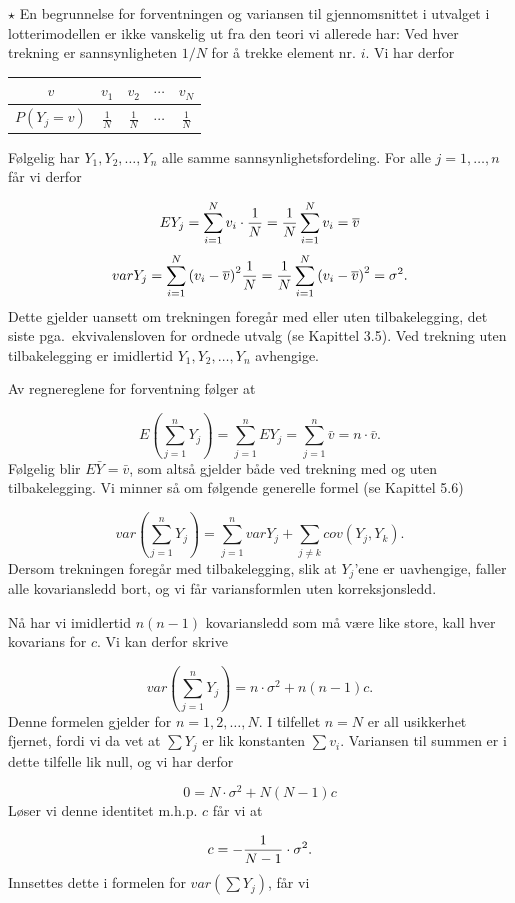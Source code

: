 $\star$ \small
En begrunnelse for forventningen og variansen til gjennomsnittet i utvalget i
lotterimodellen er ikke vanskelig ut fra den teori vi allerede har:
Ved hver trekning er sannsynligheten $1/N$ for å trekke element nr. $i$.
Vi har derfor
\begin{center}
\begin{tabular}{c|cccc}
      $v$ & $v_1$ & $v_2$ & $\cdots$ & $v_N$  \\ \hline
 $P(Y_j=v)$& $\frac{1}{N}$& $\frac{1}{N}$& $\cdots$& $\frac{1}{N}$
\end{tabular}
\end{center}
Følgelig har $Y_1,Y_2,\ldots ,Y_n$ alle samme
sannsynlighetsfordeling. For alle $j=1,\ldots ,n$ får vi derfor

\[  EY_j=\sum_{i=1}^N v_i\cdot {1\over N}=
                        {1\over N}\sum_{i=1}^N v_i=\bar v\]
\[   varY_j=\sum_{i=1}^N{(v_i-\bar v)}^2 {1\over N}
          ={1\over N}\sum_{i=1}^N{(v_i-\bar v)}^2=\sigma ^2.\]
Dette gjelder uansett om trekningen foregår med eller uten tilbakelegging,
det siste pga.\  ekvivalensloven for ordnede utvalg (se Kapittel 3.5).
Ved trekning uten tilbakelegging er imidlertid $Y_1,Y_2,\ldots ,Y_n$ avhengige.

Av regnereglene for forventning følger at

\[  E(\sum_{j=1}^n Y_j)=\sum_{j=1}^n EY_j=
                    \sum_{j=1}^n \bar{v}=n\cdot \bar{v} .\]
Følgelig blir $E\bar{Y}=\bar{v}$, som altså gjelder både 
ved trekning med og uten tilbakelegging. 
Vi minner så om følgende generelle formel (se Kapittel 5.6)

\[var(\sum_{j=1}^n Y_j)=\sum_{j=1}^n varY_j + \sum_{j\ne k} cov(Y_j,Y_k).\]
Dersom trekningen foregår med tilbakelegging, slik at
$Y_j$'ene er uavhengige, faller alle kovariansledd bort, og vi får
variansformlen uten korreksjonsledd.

Nå har vi imidlertid  $n(n-1)$ kovariansledd som må være like
store, kall hver kovarians for $c$. Vi kan derfor skrive

\[var(\sum_{j=1}^nY_j)=n\cdot \sigma ^2 + n(n-1)c.\]
Denne formelen gjelder for $n=1,2,\ldots ,N$. I tilfellet $n=N$ er
all usikkerhet fjernet, fordi vi da vet at $\sum Y_j$ er lik
konstanten $\sum v_i$. Variansen til summen er i dette tilfelle
lik null, og vi har derfor 

\[ 0=N\cdot \sigma ^2 + N(N-1)c\]
Løser vi denne identitet m.h.p. $c$ får vi at

\[    c= - {1\over N-1}\cdot \sigma ^2.\]
Innsettes dette i formelen for $var(\sum Y_j)$, får vi

